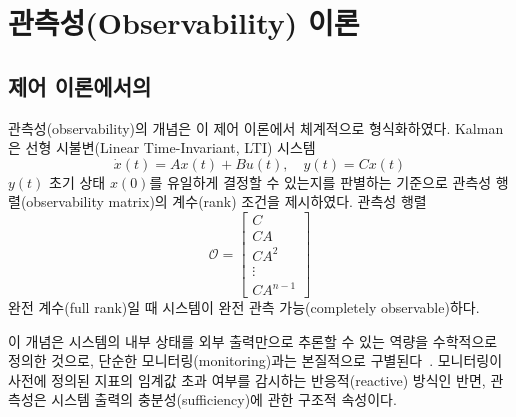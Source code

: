 

\section{관측성(Observability) 이론}
\label{sec:lit-observability}


\subsection{제어 이론에서의 }
\label{subsec:kalman-observability}

관측성(observability)의 개념은 \citet{kalman1960control}이 제어 이론에서 체계적으로 형식화하였다.
Kalman은  선형 시불변(Linear Time-Invariant, LTI) 시스템
\begin{equation}
  \dot{x}(t) = Ax(t) + Bu(t), \quad y(t) = Cx(t)
  \label{eq:lti-system}
\end{equation}
 $y(t)$ 초기 상태 $x(0)$를 유일하게 결정할 수 있는지를
판별하는 기준으로 관측성 행렬(observability matrix)의 계수(rank) 조건을 제시하였다.
관측성 행렬
\begin{equation}
  \mathcal{O} = \begin{bmatrix} C \\ CA \\ CA^2 \\ \vdots \\ CA^{n-1} \end{bmatrix}
  \label{eq:obs-matrix}
\end{equation}
 완전 계수(full rank)일 때 시스템이 완전 관측 가능(completely observable)하다.

이 개념은 시스템의 내부 상태를 외부 출력만으로 추론할 수 있는 역량을 수학적으로
정의한 것으로, 단순한 모니터링(monitoring)과는 본질적으로 구별된다~\citep{beyer2016sre}.
모니터링이 사전에 정의된 지표의 임계값 초과 여부를 감시하는 반응적(reactive) 방식인 반면,
관측성은 시스템 출력의 충분성(sufficiency)에 관한 구조적 속성이다.

